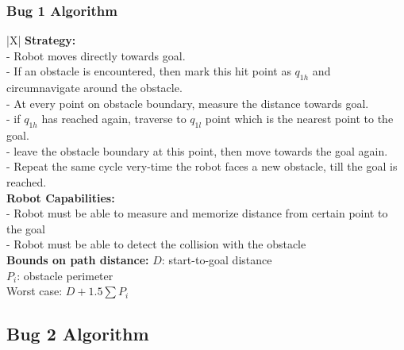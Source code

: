 \documentclass[handout]{beamer}
\begin{document}
\begin{frame}
  \frametitle{Bug 1 Algorithm}
  \centering
  \begin{scriptsize}
  \begin{table}
    \begin{tblr}{|X|}
      \hline
        \textbf{Strategy: } \\
        
           -  Robot moves directly towards goal.\\
           -  If an obstacle is encountered, then mark this hit point as $q_{1h}$ and circumnavigate around the obstacle.\\
           -  At every point on obstacle boundary, measure the distance towards goal.\\
           -  if $q_{1h}$ has reached again, traverse to $q_{1l}$ point which is the nearest point to the goal.\\
           -  leave the obstacle boundary at this point, then move towards the goal again.\\
           -  Repeat the same cycle very-time the robot faces a new obstacle, till the goal is reached.\\
        
        \hline 
        \textbf{Robot Capabilities: } \\
         - Robot must be able to measure and memorize distance from certain point to the goal \\
         - Robot must be able to detect the collision with the obstacle \\
        \hline
        \textbf{Bounds on path distance:}
        $D$: start-to-goal distance\\
        $P_{i}$: obstacle perimeter\\

        Worst case: $D + 1.5\sum P_{i}$\\
        \hline
    \end{tblr}
  \end{table}
\end{scriptsize}
\end{frame}

\subsection[Bug 2]{Bug 2 Algorithm}
\end{document}

